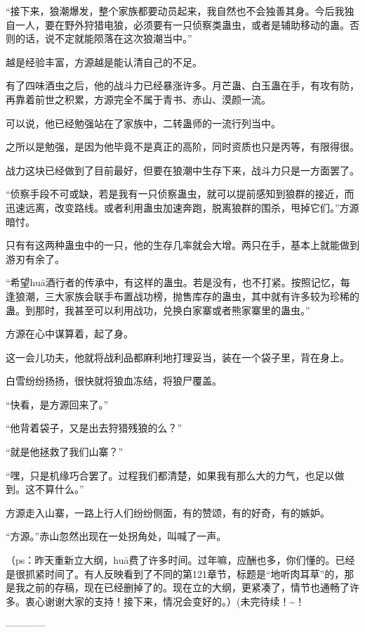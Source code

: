 \begin{this_body}
“接下来，狼潮爆发，整个家族都要动员起来，我自然也不会独善其身。今后我独自一人，要在野外狩猎电狼，必须要有一只侦察类蛊虫，或者是辅助移动的蛊。否则的话，说不定就能陨落在这次狼潮当中。”

越是经验丰富，方源越是能认清自己的不足。

有了四味酒虫之后，他的战斗力已经暴涨许多。月芒蛊、白玉蛊在手，有攻有防，再靠着前世之积累，方源完全不属于青书、赤山、漠颜一流。

可以说，他已经勉强站在了家族中，二转蛊师的一流行列当中。

之所以是勉强，是因为他毕竟不是真正的高阶，同时资质也只是丙等，有限得很。

战力这块已经做到了目前最好，但要在狼潮中生存下来，战斗力只是一方面罢了。

“侦察手段不可或缺，若是我有一只侦察蛊虫，就可以提前感知到狼群的接近，而迅速远离，改变路线。或者利用蛊虫加速奔跑，脱离狼群的围杀，甩掉它们。”方源暗忖。

只有有这两种蛊虫中的一只，他的生存几率就会大增。两只在手，基本上就能做到游刃有余了。

“希望huā酒行者的传承中，有这样的蛊虫。若是没有，也不打紧。按照记忆，每逢狼潮，三大家族会联手布置战功榜，抛售库存的蛊虫，其中就有许多较为珍稀的蛊。到那时，我甚至可以利用战功，兑换白家寨或者熊家寨里的蛊虫。”

方源在心中谋算着，起了身。

这一会儿功夫，他就将战利品都麻利地打理妥当，装在一个袋子里，背在身上。

白雪纷纷扬扬，很快就将狼血冻结，将狼尸覆盖。

“快看，是方源回来了。”

“他背着袋子，又是出去狩猎残狼的么？”

“就是他拯救了我们山寨？”

“嘿，只是机缘巧合罢了。过程我们都清楚，如果我有那么大的力气，也足以做到。这不算什么。”

方源走入山寨，一路上行人们纷纷侧面，有的赞颂，有的好奇，有的嫉妒。

“方源。”赤山忽然出现在一处拐角处，叫喊了一声。

（ps：昨天重新立大纲，huā费了许多时间。过年嘛，应酬也多，你们懂的。已经是很抓紧时间了。有人反映看到了不同的第121章节，标题是“地听肉耳草”的，那是我之前的存稿，现在已经删掉了的。现在立的大纲，更紧凑了，情节也通畅了许多。衷心谢谢大家的支持！接下来，情况会变好的。）(未完待续！\~{}！

------------

\end{this_body}

